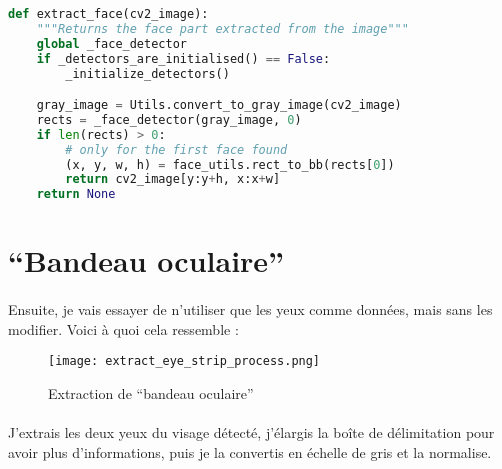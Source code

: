 \begin{lstlisting}[language=Python, caption=Extragerea feței dintr-o imagine]
def extract_face(cv2_image):
    """Returns the face part extracted from the image"""
    global _face_detector
    if _detectors_are_initialised() == False:
        _initialize_detectors()

    gray_image = Utils.convert_to_gray_image(cv2_image)
    rects = _face_detector(gray_image, 0)
    if len(rects) > 0:
        # only for the first face found
        (x, y, w, h) = face_utils.rect_to_bb(rects[0])
        return cv2_image[y:y+h, x:x+w]
    return None
\end{lstlisting}

\section{``Bandeau oculaire''}
\paragraph{}
Ensuite, je vais essayer de n'utiliser que les yeux comme données, mais sans les modifier.
Voici à quoi cela ressemble :

\begin{figure}[H]
    \centering
    \texttt{[image: extract\_eye\_strip\_process.png]}
    \caption{Extraction de ``bandeau oculaire''}
    \label{fig_extracting_eye_strip}
\end{figure}

\paragraph{}
J'extrais les deux yeux du visage détecté, j'élargis la boîte de délimitation pour avoir plus d'informations, puis je la convertis en échelle de gris et la normalise.


